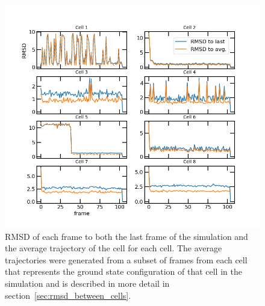 \documentclass[a4paper,11pt,oneside,final,english,toc=bib]{scrbook}
\begin{document}
\begin{figure}[ht]
\centering
  \includegraphics[width=\textwidth+0.5cm]{rmsd_last_vs_avg.png}
  \caption{RMSD of each frame to both the last frame of the simulation and the average trajectory of the cell for each cell. The average trajectories were generated from a subset of frames from each cell that represents the ground state configuration of that cell in the simulation and is described in more detail in section~\ref{sec:rmsd_between_cells}.}
  \label{fig:rmsd_last_vs_avg}
\end{figure}
\end{document}
